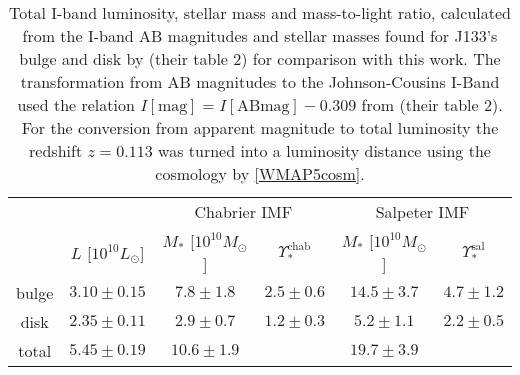 \begin{table}
\centering
\begin{tabular}{cccccc}
\hline\hline
& & \multicolumn{2}{c}{Chabrier IMF} & \multicolumn{2}{c}{Salpeter IMF}\\
      &  $L$ [$10^{10}L_{\odot}$]                & $M_*$ [$10^{10}M_\odot$]               & $\Upsilon_*^\text{chab}$ & $M_*$ [$10^{10}M_\odot$] & $\Upsilon_*^\text{sal}$ \\\hline
bulge &   $3.10 \pm 0.15 $  & $7.8 \pm 1.8$ & $2.5 \pm 0.6$ & $14.5 \pm 3.7 $ & $4.7 \pm 1.2$ \\
disk  &   $2.35 \pm 0.11 $  & $2.9 \pm 0.7$ & $1.2 \pm 0.3$ & $5.2 \pm 1.1$ & $2.2 \pm 0.5$ \\
total &   $5.45 \pm 0.19$ & $10.6 \pm 1.9$& & $19.7 \pm 3.9$&\\\hline
\end{tabular}
\caption{Total I-band luminosity, stellar mass and mass-to-light ratio, calculated from the I-band AB magnitudes and stellar masses found for J133's bulge and disk by \citet{SWELLS} (their table 2) for comparison with this work. The transformation from AB magnitudes to the Johnson-Cousins I-Band used the relation $I[\text{mag}] = I[\text{ABmag}] - 0.309$ from \citet{FG1994} (their table 2). For the conversion from apparent magnitude to total luminosity the redshift $z=0.113$ \citet{SWELLSIII} was turned into a luminosity distance using the cosmology by \ref{WMAP5cosm}. }
\label{tab:previousresults}
\end{table}